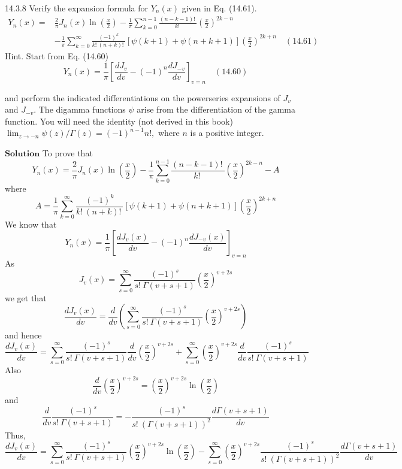 \newpage


\begin{mybox}{14.3.8}
Verify the expansion formula for $Y_{n}(x)$ given in Eq. (14.61).
$$
\begin{aligned}
Y_{n}(x)=& \frac{2}{\pi} J_{n}(x) \ln \left(\frac{x}{2}\right)-\frac{1}{\pi} \sum_{k=0}^{n-1} \frac{(n-k-1) ! \ }{k ! \ }\left(\frac{x}{2}\right)^{2 k-n} \\
&-\frac{1}{\pi} \sum_{k=0}^{\infty} \frac{(-1)^{k}}{k ! \ (n+k) ! \ }[\psi(k+1)+\psi(n+k+1)]\left(\frac{x}{2}\right)^{2 k+n} \quad (14.61)
\end{aligned}
$$
Hint. Start from Eq. (14.60) 
$$
Y_{n}(x)=\frac{1}{\pi}\left[\frac{d J_{v}}{d v}-(-1)^{n} \frac{d J_{-v}}{d v}\right]_{v=n} \quad (14.60)
$$

and perform the indicated differentiations on the powerseries expansions of $J_{v}$ and $J_{-v}$. The digamma functions $\psi$ arise from the differentiation of the gamma function. You will need the identity (not derived in this book) $\lim _{z \rightarrow-n} \psi(z) / \Gamma(z)=(-1)^{n-1} n !,$ where $n$ is a positive integer.

\end{mybox}
$\boxed{\textbf{Solution}}$ To prove that 
$$Y_{n}(x)=\frac{2}{\pi} J_{n}(x) \ln \left(\frac{x}{2}\right)-\frac{1}{\pi} \sum_{k=0}^{n-1} \frac{(n-k-1) ! \ }{k ! \ }\left(\frac{x}{2}\right)^{2 k-n}-A$$ 
where
$$A=\frac{1}{\pi} \sum_{k=0}^{\infty} \frac{(-1)^{k}}{k ! \ (n+k) ! \ }[\psi(k+1)+\psi(n+k+1)]\left(\frac{x}{2}\right)^{2 k+n}$$
We know that 
$$Y_{n}(x)=\frac{1}{\pi}\left[\frac{d J_{v}(x)}{d v}-(-1)^{n} \frac{d J_{-v}(x)}{d v}\right]_{v=n}$$
As 
$$J_{v}(x)=\sum_{s=0}^{\infty} \frac{(-1)^{s}}{s ! \  \Gamma(v+s+1)}\left(\frac{x}{2}\right)^{v+2 s}$$ 
we get that 
$$\frac{d J_{v}(x)}{d v}=\frac{d}{d v}\left(\sum_{s=0}^{\infty} \frac{(-1)^{s}}{s ! \  \Gamma(v+s+1)}\left(\frac{x}{2}\right)^{v+2 s}\right)$$
and hence 
$$\frac{d J_{v}(x)}{d v}=\sum_{s=0}^{\infty} \frac{(-1)^{s}}{s ! \  \Gamma(v+s+1)} \frac{d}{d v}\left(\frac{x}{2}\right)^{v+2 s}+\sum_{s=0}^{\infty}\left(\frac{x}{2}\right)^{v+2 s} \frac{d}{d v} \frac{(-1)^{s}}{s ! \  \Gamma(v+s+1)}$$
Also 
$$\frac{d}{d v}\left(\frac{x}{2}\right)^{v+2 s}=\left(\frac{x}{2}\right)^{v+2 s} \ln \left(\frac{x}{2}\right)$$ 
and 
$$\frac{d}{d v} \frac{(-1)^{s}}{s ! \  \Gamma(v+s+1)}=-\frac{(-1)^{s}}{s ! \ (\Gamma(v+s+1))^{2}} \frac{d \Gamma(v+s+1)}{d v}$$
Thus, 
$$\frac{d J_{v}(x)}{d v}=\sum_{s=0}^{\infty} \frac{(-1)^{s}}{s ! \  \Gamma(v+s+1)}\left(\frac{x}{2}\right)^{v+2 s} \ln \left(\frac{x}{2}\right)-\sum_{s=0}^{\infty}\left(\frac{x}{2}\right)^{v+2 s} \frac{(-1)^{s}}{s ! \ (\Gamma(v+s+1))^{2}} \frac{d \Gamma(v+s+1)}{d v}$$
